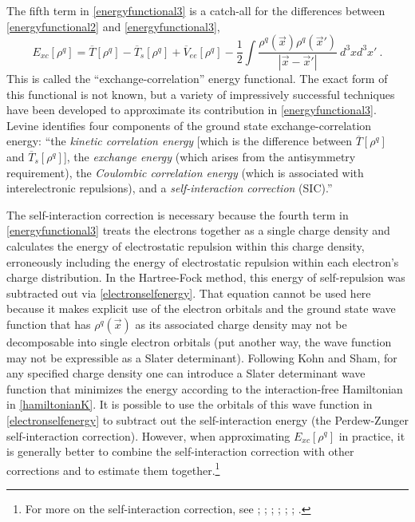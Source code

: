\documentclass[onecolumn,secnumarabic,amsmath,amssymb,balancelastpage,nofootinbib]{article}
\begin{document}
The fifth term in \eqref{energyfunctional3} is a catch-all for the differences between \eqref{energyfunctional2} and \eqref{energyfunctional3},
\begin{equation}
E_{xc}[\rho^q] = \overline{T}[\rho^q] - \overline{T}_s[\rho^q] + \overline{V}_{ee}[\rho^q] - \frac{1}{2}\int{\frac{\rho^q(\vec{x}) \rho^q(\vec{x}')}{|\vec{x}-\vec{x}'|}\  d^3 x d^3 x'}
\ .
\end{equation}
This is called the ``exchange-correlation'' energy functional.  The exact form of this functional is not known, but a variety of impressively successful techniques have been developed to approximate its contribution in \eqref{energyfunctional3}.  Levine \cite[pg. 559]{levineQC} identifies four components of the ground state exchange-correlation energy: ``the \emph{kinetic correlation energy} [which is the difference between $\overline{T}[\rho^q]$ and $\overline{T}_s[\rho^q]$], the \emph{exchange energy} (which arises from the antisymmetry requirement), the \emph{Coulombic correlation energy} (which is associated with interelectronic repulsions), and a \emph{self-interaction correction} (SIC).''

The self-interaction correction is necessary because the fourth term in \eqref{energyfunctional3} treats the electrons together as a single charge density and calculates the energy of electrostatic repulsion within this charge density, erroneously including the energy of electrostatic repulsion within each electron's charge distribution.  In the Hartree-Fock method, this energy of self-repulsion was subtracted out via \eqref{electronselfenergy}.  That equation cannot be used here because it makes explicit use of the electron orbitals and the ground state wave function that has $\rho^q(\vec{x})$ as its associated charge density may not be decomposable into single electron orbitals (put another way, the wave function may not be expressible as a Slater determinant).  Following Kohn and Sham, for any specified charge density one can introduce a Slater determinant wave function that minimizes the energy according to the interaction-free Hamiltonian in \eqref{hamiltonianK}.  It is possible to use the orbitals of this wave function in \eqref{electronselfenergy} to subtract out the self-interaction energy (the Perdew-Zunger self-interaction correction).  However, when approximating $E_{xc}[\rho^q]$ in practice, it is generally better to combine the self-interaction correction with other corrections and to estimate them together.\footnote{For more on the self-interaction correction, see \cite{perdew1981}; \cite[sec.\ 8.3]{parryang}; \cite{baerends1997, baerends2005}; \cite[footnote 33]{argaman2000}; \cite[sec.\ 2.3 \& 6.7]{koch2001}; \cite[sec.\ 4.7]{engel2011}; \cite{tsuneda2014}.}
\end{document}
